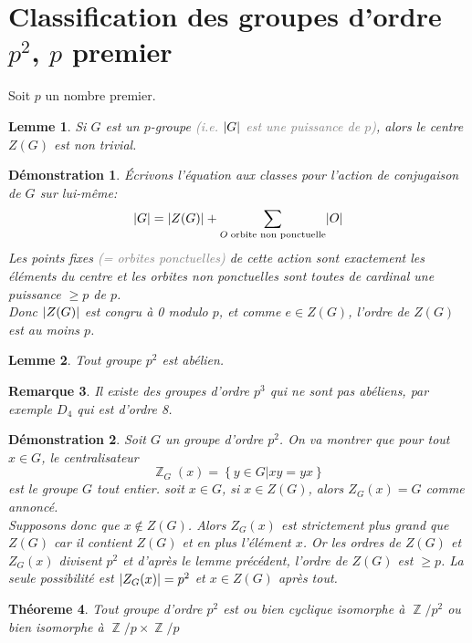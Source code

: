 \documentclass[a4paper, oneside]{report}
\theoremstyle{break}
\newtheorem{thm}{Théoreme}[section] %
\newtheorem{lemme}[thm]{Lemme}
\newtheorem{remarque}[thm]{Remarque}
\newtheorem*{demonstration}{Démonstration}
\newcommand{\gray}[1]{\textcolor{gray}{#1}}
\DeclareMathOperator{\Z}{\mathbb{Z}}
\DeclarePairedDelimiter\ens{\left\{ }{\right\} }%
\DeclarePairedDelimiter\abs{\lvert}{\rvert}%
\renewcommand{\ens}[1]{\left\{ #1 \right\} }%
\newcommand{\Ens}{\ens}
\begin{document}
\section{Classification des groupes d'ordre \texorpdfstring{$p^2$, $p$ premier}{L}}

Soit $p$ un nombre premier.

\begin{lemme}
Si $G$ est un $p$-groupe \gray{(i.e. $\abs{G}$ est une puissance de $p$)}, alors le centre $Z(G)$ est non trivial.
\end{lemme}

\begin{demonstration}
Écrivons l'équation aux classes pour l'action de conjugaison de $G$ sur lui-même:
\[
\abs{G} = \abs{Z(G)} + \sum_{O \;\text{orbite non ponctuelle}} \abs{O}
\]
Les points fixes \gray{(= orbites ponctuelles)} de cette action sont exactement les éléments du centre et les orbites non ponctuelles sont toutes de cardinal une puissance $\geq p$ de $p$.\\
Donc $\abs{Z(G)}$ est congru à 0 modulo $p$, et comme $e \in Z(G)$, l'ordre de $Z(G)$ est au moins $p$.
\end{demonstration}

\begin{lemme}
Tout groupe $p^2$ est abélien.
\end{lemme}

\begin{remarque}
Il existe des groupes d'ordre $p^3$ qui ne sont pas abéliens, par exemple $D_4$ qui est d'ordre 8.
\end{remarque}

\begin{demonstration}
Soit $G$ un groupe d'ordre $p^2$. On va montrer que pour tout $x \in G$, le centralisateur 
\[
\Z_G(x) = \Ens{y \in G \big| xy = yx}
\]
est le groupe $G$ tout entier. soit $x \in G$, si $x \in Z(G)$, alors $Z_G(x) = G$ comme annoncé.\\
Supposons donc que $x \notin Z(G)$. Alors $Z_G(x)$ est strictement plus grand que $Z(G)$ car il contient $Z(G)$ et en plus l'élément $x$. Or les ordres de $Z(G)$ et $Z_G(x)$ divisent $p^2$ et d'après le lemme précédent, l'ordre de $Z(G)$ est $\geq p$. La seule possibilité est $\abs{Z_G(x)} = p^2$ et $x \in Z(G)$ après tout.
\end{demonstration}

\begin{thm}
Tout groupe d'ordre $p^2$ est ou bien cyclique isomorphe à $\Z/p^2$ ou bien isomorphe à $\Z/p \times \Z/p$
\end{thm}
\end{document}
